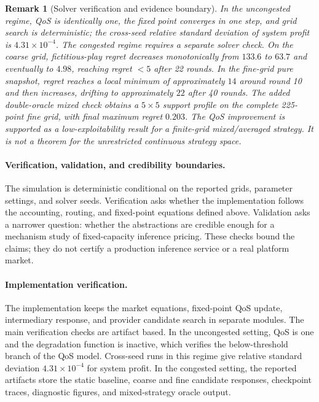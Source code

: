 \documentclass[11pt,a4paper]{article}
\newtheorem{remark}{Remark}
\begin{document}
\begin{remark}[Solver verification and evidence boundary]
In the uncongested regime, QoS is identically one, the fixed point converges in one step, and grid search is deterministic; the cross-seed relative standard deviation of system profit is $4.31\times10^{-4}$. The congested regime requires a separate solver check. On the coarse grid, fictitious-play regret decreases monotonically from $133.6$ to $63.7$ and eventually to $4.98$, reaching regret $<5$ after 22 rounds. In the fine-grid pure snapshot, regret reaches a local minimum of approximately $14$ around round 10 and then increases, drifting to approximately $22$ after 40 rounds. The added double-oracle mixed check obtains a $5\times5$ support profile on the complete 225-point fine grid, with final maximum regret $0.203$. The QoS improvement is supported as a low-exploitability result for a finite-grid mixed/averaged strategy. It is not a theorem for the unrestricted continuous strategy space.
\end{remark}

\paragraph{Verification, validation, and credibility boundaries.}
\label{sec:vv}

The simulation is deterministic conditional on the reported grids, parameter settings, and solver seeds. Verification asks whether the implementation follows the accounting, routing, and fixed-point equations defined above. Validation asks a narrower question: whether the abstractions are credible enough for a mechanism study of fixed-capacity inference pricing. These checks bound the claims; they do not certify a production inference service or a real platform market.

\paragraph{Implementation verification.}

The implementation keeps the market equations, fixed-point QoS update, intermediary response, and provider candidate search in separate modules. The main verification checks are artifact based. In the uncongested setting, QoS is one and the degradation function is inactive, which verifies the below-threshold branch of the QoS model. Cross-seed runs in this regime give relative standard deviation $4.31\times10^{-4}$ for system profit. In the congested setting, the reported artifacts store the static baseline, coarse and fine candidate responses, checkpoint traces, diagnostic figures, and mixed-strategy oracle output.
\end{document}
